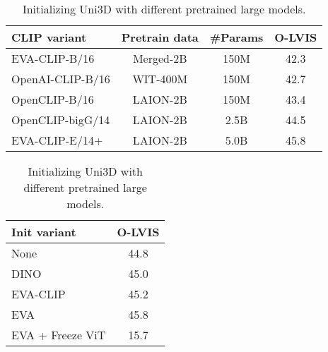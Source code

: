 \documentclass{article} \usepackage{iclr2024_conference,times}
\begin{document}
\begin{table}
  \begin{minipage}{0.60\textwidth}
    \caption{Different CLIP teachers at different model scales.}
    \vspace{0.3cm}
    \centering
    \begin{tabular}{lccc}
        \toprule
        CLIP variant & Pretrain data & \#Params & O-LVIS \\ \hline
        EVA-CLIP-B/16 & Merged-2B & 150M &42.3  \\
        OpenAI-CLIP-B/16 & WIT-400M & 150M & 42.7 \\
        OpenCLIP-B/16 & LAION-2B & 150M & 43.4 \\ 
        \midrule
        OpenCLIP-bigG/14 & LAION-2B & 2.5B & 44.5 \\
        EVA-CLIP-E/14+ & LAION-2B & 5.0B & 45.8 \\
        \bottomrule
    \end{tabular}
    \label{tab:teacher_scaling}
    
  \end{minipage}\hspace{0.5cm}
  \begin{minipage}{0.35\textwidth}
    \caption{Initializing Uni3D with different pretrained large models.}
\vspace{0.2cm}
    
    \begin{tabular}{l|c}
        \toprule
        Init variant &  O-LVIS \\ \midrule
        None & 44.8 \\
        DINO & 45.0\\
        EVA-CLIP & 45.2 \\
        EVA & 45.8  \\
        \midrule
        EVA + Freeze ViT & 15.7  \\

        \bottomrule
    \end{tabular}

    \label{tab:init_vit1}
  \end{minipage}
  \vspace{-0.3cm}
\end{table}


    
\end{document}
